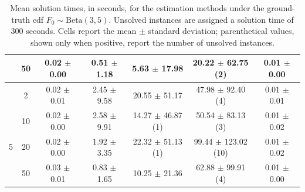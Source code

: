 \begin{table}[h]
\begin{tabular}{cc|c|ccc|c}
 & 50 & 0.02 $\pm$ 0.00 & 0.51 $\pm$ 1.18 & 5.63 $\pm$ 17.98 & 20.22 $\pm$ 62.75 (2) & 0.01 $\pm$ 0.00 \\
\midrule
 & 2 & 0.02 $\pm$ 0.01 & 2.45 $\pm$ 9.58 & 20.55 $\pm$ 51.17 & 47.98 $\pm$ 92.40 (4) & 0.01 $\pm$ 0.01 \\
 & 10 & 0.02 $\pm$ 0.00 & 2.58 $\pm$ 9.91 & 14.27 $\pm$ 46.87 (1) & 50.54 $\pm$ 83.13 (3) & 0.01 $\pm$ 0.02 \\
5 & 20 & 0.02 $\pm$ 0.00 & 1.92 $\pm$ 3.35 & 22.32 $\pm$ 51.13 (1) & 99.44 $\pm$ 123.02 (10) & 0.01 $\pm$ 0.02 \\
 & 50 & 0.03 $\pm$ 0.01 & 0.83 $\pm$ 1.65 & 10.25 $\pm$ 21.36 & 62.88 $\pm$ 99.91 (4) & 0.01 $\pm$ 0.00 \\
\bottomrule
\end{tabular}
\caption{\normalfont Mean solution times, in seconds, for the estimation methods under the ground-truth cdf $F_0\sim\text{Beta}(3,5)$. Unsolved instances are assigned a solution time of 300 seconds. Cells report the mean $\pm$ standard deviation; parenthetical values, shown only when positive, report the number of unsolved instances.}
\label{tab:solve_times}
\end{table}